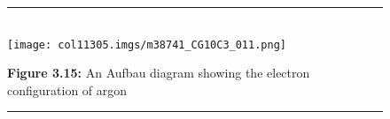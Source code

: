     \setcounter{subfigure}{0}
	\begin{figure}[H] %
    \begin{center}
    \rule[.1in]{\figurerulewidth}{.005in} \\
        \label{m38741*uid103!!!underscore!!!media}\label{m38741*uid103!!!underscore!!!printimage}\texttt{[image: col11305.imgs/m38741\_CG10C3\_011.png]} %
      \vspace{2pt}
    \vspace{\rubberspace}\par \begin{cnxcaption}
	  \small \textbf{Figure 3.15: }An Aufbau diagram showing the electron configuration of argon
	\end{cnxcaption}
    \vspace{.1in}
    \rule[.1in]{\figurerulewidth}{.005in} \\
    \end{center}
 \end{figure}       
      \par
            \label{m38741*eip-138}\vspace{.5cm} 
      \noindent
